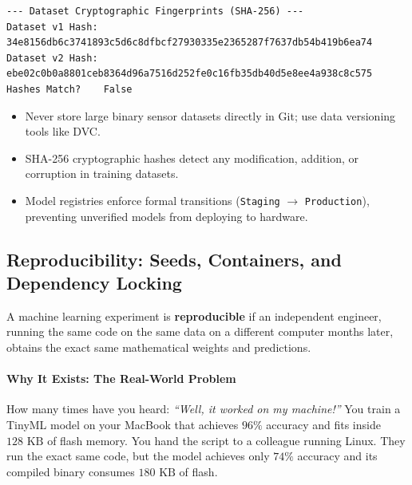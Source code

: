 \begin{lstlisting}[style=outputstyle]
--- Dataset Cryptographic Fingerprints (SHA-256) ---
Dataset v1 Hash: 34e8156db6c3741893c5d6c8dfbcf27930335e2365287f7637db54b419b6ea74
Dataset v2 Hash: ebe02c0b0a8801ceb8364d96a7516d252fe0c16fb35db40d5e8ee4a938c8c575
Hashes Match?    False
\end{lstlisting}

\begin{takeaways}
\begin{itemize}
    \item Never store large binary sensor datasets directly in Git; use data versioning tools like DVC.
    \item SHA-256 cryptographic hashes detect any modification, addition, or corruption in training datasets.
    \item Model registries enforce formal transitions (\texttt{Staging} $\to$ \texttt{Production}), preventing unverified models from deploying to hardware.
\end{itemize}
\end{takeaways}

\subsection{Reproducibility: Seeds, Containers, and Dependency Locking}

\begin{keyidea}
A machine learning experiment is \textbf{reproducible} if an independent engineer, running the same code on the same data on a different computer months later, obtains the exact same mathematical weights and predictions.
\end{keyidea}

\paragraph{Why It Exists: The Real-World Problem}
How many times have you heard: \textit{``Well, it worked on my machine!''} You train a TinyML model on your MacBook that achieves $96\%$ accuracy and fits inside $128\text{ KB}$ of flash memory. You hand the script to a colleague running Linux. They run the exact same code, but the model achieves only $74\%$ accuracy and its compiled binary consumes $180\text{ KB}$ of flash. 

